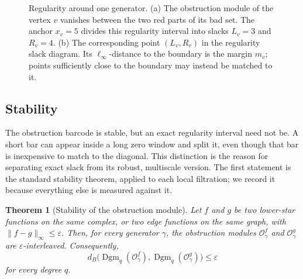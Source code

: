 \documentclass[11pt,letterpaper]{article}
\newtheorem{theorem}{Theorem}[section]
\theoremstyle{definition}
\newcommand{\Dgm}{\operatorname{Dgm}}
\newcommand{\Oc}{\mathcal O}
\newcommand{\eps}{\varepsilon}
\begin{document}
\begin{figure}[t]
\caption{Regularity around one generator. (a) The obstruction module of the
vertex $v$ vanishes between the two red parts of its bad set. The anchor
$x_v=5$ divides this regularity interval into slacks $L_v=3$ and $R_v=4$.
(b) The corresponding point $(L_v,R_v)$ in the regularity slack diagram. Its
$\ell_\infty$-distance to the boundary is the margin $m_v$; points sufficiently
close to the boundary may instead be matched to it.}
\label{fig:rsd}
\end{figure}


\subsection{Stability}
\label{sec:stability}

The obstruction barcode is stable, but an exact regularity interval need not
be. A short bar can appear inside a long zero window and split it, even though
that bar is inexpensive to match to the diagonal. This distinction is the
reason for separating exact slack from its robust, multiscale version. The
first statement is the standard stability theorem, applied to each local
filtration; we record it because everything else is measured against it.

\begin{theorem}[Stability of the obstruction module]
\label{thm:universal-obstruction-stability}
Let $f$ and $g$ be two lower-star functions on the same complex, or two edge
functions on the same graph, with $\|f-g\|_\infty\leq\eps$. Then, for every
generator $\gamma$, the obstruction modules $\Oc_\gamma^f$ and
$\Oc_\gamma^g$ are $\eps$-interleaved. Consequently,
$$
d_B\bigl(\Dgm_q(\Oc_\gamma^f),\Dgm_q(\Oc_\gamma^g)\bigr)\leq\eps
$$
for every degree $q$.
\end{theorem}
\end{document}
